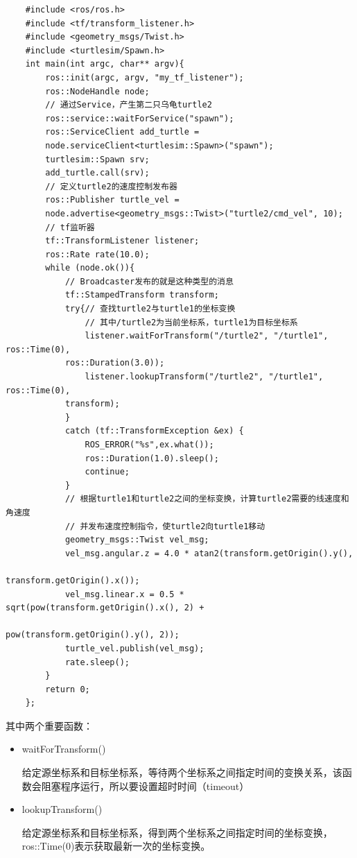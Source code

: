 \documentclass[9pt, oneside]{book}
\begin{document}
\begin{verbatim}
    #include <ros/ros.h>
    #include <tf/transform_listener.h>
    #include <geometry_msgs/Twist.h>
    #include <turtlesim/Spawn.h>
    int main(int argc, char** argv){
        ros::init(argc, argv, "my_tf_listener");
        ros::NodeHandle node;
        // 通过Service，产生第二只乌龟turtle2
        ros::service::waitForService("spawn");
        ros::ServiceClient add_turtle =
        node.serviceClient<turtlesim::Spawn>("spawn");
        turtlesim::Spawn srv;
        add_turtle.call(srv);
        // 定义turtle2的速度控制发布器
        ros::Publisher turtle_vel =
        node.advertise<geometry_msgs::Twist>("turtle2/cmd_vel", 10);
        // tf监听器
        tf::TransformListener listener;
        ros::Rate rate(10.0);
        while (node.ok()){
            // Broadcaster发布的就是这种类型的消息
            tf::StampedTransform transform;
            try{// 查找turtle2与turtle1的坐标变换
                // 其中/turtle2为当前坐标系，turtle1为目标坐标系
                listener.waitForTransform("/turtle2", "/turtle1", ros::Time(0), 
            ros::Duration(3.0));
                listener.lookupTransform("/turtle2", "/turtle1", ros::Time(0), 
            transform);
            }
            catch (tf::TransformException &ex) {
                ROS_ERROR("%s",ex.what());
                ros::Duration(1.0).sleep();
                continue;
            }
            // 根据turtle1和turtle2之间的坐标变换，计算turtle2需要的线速度和角速度
            // 并发布速度控制指令，使turtle2向turtle1移动
            geometry_msgs::Twist vel_msg;
            vel_msg.angular.z = 4.0 * atan2(transform.getOrigin().y(),
                                            transform.getOrigin().x());
            vel_msg.linear.x = 0.5 * sqrt(pow(transform.getOrigin().x(), 2) +
                                          pow(transform.getOrigin().y(), 2));
            turtle_vel.publish(vel_msg);
            rate.sleep();
        }
        return 0;
    };
\end{verbatim}

其中两个重要函数：
\begin{itemize}
    \item waitForTransform()
    
    给定源坐标系和目标坐标系，等待两个坐标系之间指定时间的变换关系，该函数会阻塞程序运行，所以要设置超时时间（timeout）

    \item lookupTransform()
    
    给定源坐标系和目标坐标系，得到两个坐标系之间指定时间的坐标变换，ros::Time(0)表示获取最新一次的坐标变换。
    
\end{itemize}
\end{document}
